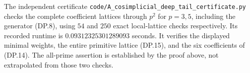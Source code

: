 The independent certificate
\texttt{code/A\_cosimplicial\_deep\_tail\_certificate.py}
checks the complete coefficient lattices through $p^2$
for $p=3,5$, including the generator (DP.8), using
$54$ and $250$ exact local-lattice checks respectively.
Its recorded runtime is $0.09312325301289093$ seconds.
It verifies the displayed minimal weights, the entire
primitive lattice (DP.15), and the six coefficients
of (DP.14). The all-prime assertion is established by
the proof above, not extrapolated from those two checks.
